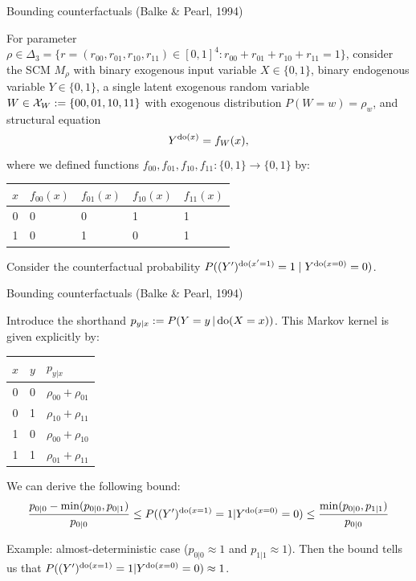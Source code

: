 \begin{frame}{Bounding counterfactuals (Balke \& Pearl, 1994)}
\begin{example}[1/2]
  For parameter $\rho\in\Delta_3=\{r=(r_{00},r_{01},r_{10},r_{11}) \in [0,1]^4 : r_{00}+r_{01}+r_{10}+r_{11}= 1\}$, consider the SCM $M_\rho$ with binary exogenous input variable $X \in \{0,1\}$, binary endogenous variable $Y \in \{0,1\}$, a single latent exogenous random variable $W \in \mathcal{X}_W := \{00,01,10,11\}$ with exogenous distribution $P(W=w) = \rho_w$,
and structural equation
  $$Y^{\operatorname{do}(x)} = f_{W}(x),$$
where we defined functions $f_{00},f_{01},f_{10},f_{11} : \{0,1\} \to \{0,1\}$ by:
  \begin{center}\begin{tabular}{c|llll}
    $x$ & $f_{00}(x)$ & $f_{01}(x)$ & $f_{10}(x)$ & $f_{11}(x)$ \\
    \hline
    0   & 0           & 0           & 1           & 1 \\
    1   & 0           & 1           & 0           & 1 
  \end{tabular}\end{center}

  Consider the counterfactual probability $P((Y')^{\operatorname{do}(x'=1)}=1\mid Y^{\operatorname{do}(x=0)}=0)$. 
\end{example}
\end{frame}

\begin{frame}{Bounding counterfactuals (Balke \& Pearl, 1994)}
\begin{example}[2/2]
Introduce the shorthand $p_{y|x} := P(Y=y\operatorname*{|} \operatorname{do}(X=x))$. This Markov kernel is given explicitly by:
  \begin{center}\begin{tabular}{ccl}
    $x$ & $y$ & $p_{y|x}$ \\
    \hline
    0   & 0   & $\rho_{00} + \rho_{01}$ \\ %
    0   & 1   & $\rho_{10} + \rho_{11}$ \\ %
    1   & 0   & $\rho_{00} + \rho_{10}$ \\ %
    1   & 1   & $\rho_{01} + \rho_{11}$ \\ %
  \end{tabular}\end{center}
We can derive the following bound:
$$\small \frac{p_{0|0} - \min(p_{0|0},p_{0|1})}{p_{0|0}} \le P((Y')^{\operatorname{do}(x=1)} = 1 | Y^{\operatorname{do}(x=0)}=0) \le \frac{\min(p_{0|0},p_{1|1})}{p_{0|0}}$$
\end{example}

Example: almost-deterministic case ($p_{0|0} \approx 1$ and $p_{1|1} \approx 1$).
Then the bound tells us that $P((Y')^{\operatorname{do}(x=1)} = 1 | Y^{\operatorname{do}(x=0)}=0) \approx 1$.
\end{frame}


